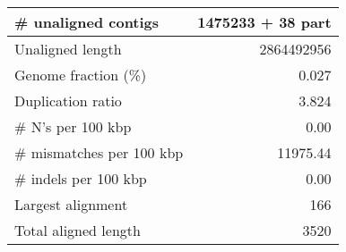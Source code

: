 \documentclass[12pt,a4paper]{article}
\begin{document}
\begin{table}[ht]
\begin{center}
\begin{tabular}{|l*{1}{|r}|}
\# unaligned contigs & 1475233 + 38 part \\ \hline
Unaligned length & 2864492956 \\ \hline
Genome fraction (\%) & 0.027 \\ \hline
Duplication ratio & 3.824 \\ \hline
\# N's per 100 kbp & 0.00 \\ \hline
\# mismatches per 100 kbp & 11975.44 \\ \hline
\# indels per 100 kbp & 0.00 \\ \hline
Largest alignment & 166 \\ \hline
Total aligned length & 3520 \\ \hline
\end{tabular}
\end{center}
\end{table}
\end{document}
